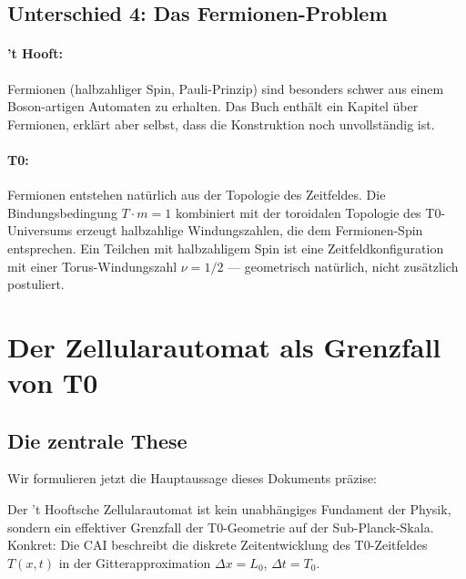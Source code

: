 \subsection{Unterschied 4: Das Fermionen-Problem}

\paragraph{'t Hooft:} Fermionen (halbzahliger Spin, Pauli-Prinzip) sind besonders
schwer aus einem Boson-artigen Automaten zu erhalten. Das Buch enthält ein Kapitel
über Fermionen, erklärt aber selbst, dass die Konstruktion noch unvollständig ist.

\paragraph{T0:} Fermionen entstehen natürlich aus der Topologie des Zeitfeldes.
Die Bindungsbedingung $T \cdot m = 1$ kombiniert mit der toroidalen Topologie
des T0-Universums erzeugt halbzahlige Windungszahlen, die dem Fermionen-Spin
entsprechen. Ein Teilchen mit halbzahligem Spin ist eine Zeitfeldkonfiguration
mit einer Torus-Windungszahl $\nu = 1/2$ — geometrisch natürlich, nicht
zusätzlich postuliert.

\clearpage

\section{Der Zellularautomat als Grenzfall von T0}
\label{sec:ca_as_limit}

\subsection{Die zentrale These}

Wir formulieren jetzt die Hauptaussage dieses Dokuments präzise:

\begin{revolutionary}
    Der 't Hooftsche Zellularautomat ist kein unabhängiges Fundament der Physik,
    sondern ein effektiver Grenzfall der T0-Geometrie auf der Sub-Planck-Skala.
    Konkret: Die CAI beschreibt die diskrete Zeitentwicklung des T0-Zeitfeldes
    $T(x,t)$ in der Gitterapproximation $\Delta x = L_0$, $\Delta t = T_0$.
\end{revolutionary}


